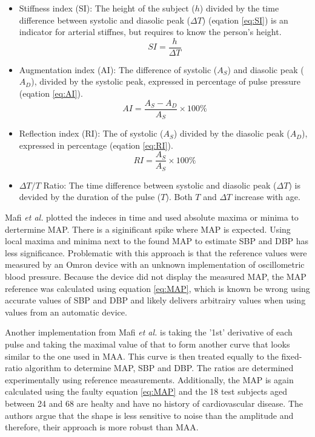\begin{itemize}

\item Stiffness index (SI): The height of the subject ($h$) divided by the time difference between systolic and diasolic peak ($\Delta T$) (eqation \ref{eq:SI}) is an indicator for arterial stiffnes, but requires to know the person's height. 
\begin{equation}
\label{eq:SI}
SI=\frac{h}{\Delta T}
\end{equation}

\item Augmentation index (AI): The difference of systolic ($A_S$) and diasolic peak ($A_D$), divided by the systolic peak, expressed in percentage of pulse pressure (eqation \ref{eq:AI}). 
\begin{equation}
\label{eq:AI}
AI=\frac{A_S-A_D}{A_S}\times100\%
\end{equation}


\item Reflection index (RI): The of systolic ($A_S$) divided by the diasolic peak ($A_D$), expressed in percentage (eqation \ref{eq:RI}).
\begin{equation}
\label{eq:RI}
RI=\frac{A_S}{A_S}\times100\%
\end{equation}



\item $\Delta T/T$ Ratio: The time difference between systolic and diasolic peak ($\Delta T$) is devided by the duration of the pulse ($T$). Both $T$ and $\Delta T$ increase with age. 

\end{itemize}

Mafi \textit{et al.}\cite{Mafi2011} plotted the indeces in time and used absolute maxima or minima to dertermine MAP. There is a siginificant spike where MAP is expected. Using local maxima and minima next to the found MAP to estimate SBP and DBP has less significance. Problematic with this approach is that the reference values were measured by an Omron device with an unknown implementation of oscillometric blood pressure. Because the device did not display the measured MAP, the MAP reference was calculated using equation \ref{eq:MAP}, which is known be wrong using accurate values of SBP and DBP and likely delivers arbitrairy values when using values from an automatic device.
 
Another implementation from Mafi \textit{et al.}\cite{Mafi2012} is taking the '1st' derivative of each pulse and taking the maximal value of that to form another curve that looks similar to the one used in MAA. This curve is then treated equally to the fixed-ratio algorithm to determine MAP, SBP and DBP. The ratios are determined experimentally using reference measurements. Additionally, the MAP is again calculated using the faulty equation \ref{eq:MAP} and the 18 test subjects aged between 24 and 68 are healty and have no history of cardiovascular disease. The authors argue that the shape is less sensitive to noise than the amplitude and therefore, their approach is more robust than MAA. 
 
